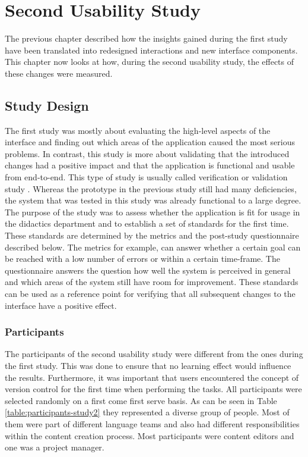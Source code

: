 \chapter{Second Usability Study} \label{chapter:second-iteration}
The previous chapter described how the insights gained during the first study have been translated into redesigned interactions and new interface components. This chapter now looks at how, during the second usability study, the effects of these changes were measured.

\section{Study Design}
The first study was mostly about evaluating the high-level aspects of the interface and finding out which areas of the application caused the most serious problems. In contrast, this study is more about validating that the introduced changes had a positive impact and that the application is functional and usable from end-to-end. This type of study is usually called verification or validation study \cite{rubin_handbook_2008,sauro_quantifying_2012}. Whereas the prototype in the previous study still had many deficiencies, the system that was tested in this study was already functional to a large degree. The purpose of the study was to assess whether the application is fit for usage in the didactics department and to establish a set of standards for the first time. These standards are determined by the metrics and the post-study questionnaire described below. The metrics for example, can answer whether a certain goal can be reached with a low number of errors or within a certain time-frame. The questionnaire answers the question how well the system is perceived in general and which areas of the system still have room for improvement. These standards can be used as a reference point for verifying that all subsequent changes to the interface have a positive effect.

\subsection{Participants}
The participants of the second usability study were different from the ones during the first study. This was done to ensure that no learning effect would influence the results. Furthermore, it was important that users encountered the concept of version control for the first time when performing the tasks. All participants were selected randomly on a first come first serve basis. As can be seen in Table \ref{table:participants-study2} they represented a diverse group of people. Most of them were part of different language teams and also had different responsibilities within the content creation process. Most participants were content editors and one was a project manager.

